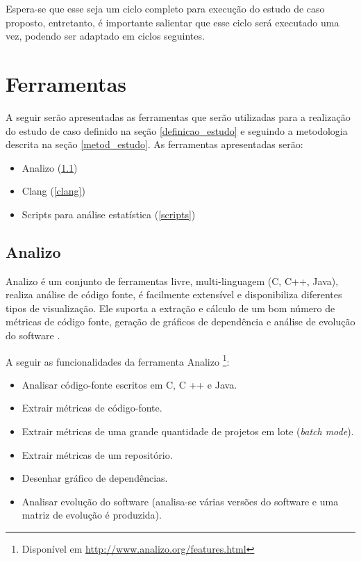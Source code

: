 Espera-se que esse seja um ciclo completo para execução do estudo de caso proposto, entretanto, é importante salientar que esse
ciclo será executado uma vez, podendo ser adaptado em ciclos seguintes.

\section{Ferramentas} \label{tools}

A seguir serão apresentadas as ferramentas que serão utilizadas para a realização do estudo de caso definido na seção 
\ref{definicao_estudo} e seguindo a metodologia descrita na seção \ref{metod_estudo}. As ferramentas apresentadas serão:

\begin{itemize}
  \item Analizo (\ref{analizo})
  \item Clang (\ref{clang})
  \item Scripts para análise estatística (\ref{scripts})
\end{itemize}

\subsection{Analizo} \label{analizo}

Analizo é um conjunto de ferramentas livre, multi-linguagem (C, C++, Java), realiza análise de código fonte, é facilmente 
extensível e disponibiliza diferentes tipos de visualização. Ele suporta a extração e cálculo de um bom número de métricas de 
código fonte, geração de gráficos de dependência e análise de evolução do software \cite{analizo}.

A seguir as funcionalidades da ferramenta Analizo \footnote{Disponível em
\url{http://www.analizo.org/features.html}}:

\begin{itemize}
  \item Analisar código-fonte escritos em C, C ++ e Java.
  \item Extrair métricas de código-fonte.
  \item Extrair métricas de uma grande quantidade de projetos em lote (\textit{batch mode}).
  \item Extrair métricas de um repositório.
  \item Desenhar gráfico de dependências.
  \item Analisar evolução do software (analisa-se várias versões do software e uma matriz de evolução é produzida).
\end{itemize}

